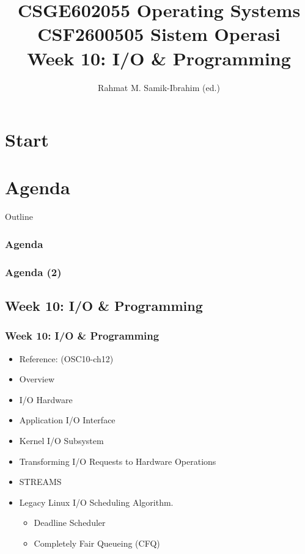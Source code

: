 \documentclass[xcolor=table, notheorems, hyperref={pdfpagelabels=false}]{beamer}
\title[\kopikopi]
{CSGE602055 Operating Systems \\ 
CSF2600505 Sistem Operasi \\
Week 10:
I/O \& Programming}
\author{Rahmat M. Samik-Ibrahim (ed.)}
\date{\revision}
\institute[UI]
{
University of Indonesia \\
\medskip
\url{https://os.vlsm.org/Slides/os10.pdf}
\\ \texttt{Always check for the latest revision!}
}
\begin{document}
\section{Start}
\begin{frame}
\titlepage
\end{frame}





\section{Agenda}
\begin{frame}{Outline}
  \frametitle{Agenda}
  \tableofcontents[sections={1-13}]
\end{frame}
\begin{frame}
   \frametitle{Agenda (2)}
   \tableofcontents[sections={14-}]
\end{frame}




\begin{frame}
\section{Week 10: I/O \& Programming}
\frametitle{Week 10: I/O \& Programming}
\begin{itemize}
\item Reference: (OSC10-ch12)
\item Overview
\item I/O Hardware
\item Application I/O Interface
\item Kernel I/O Subsystem
\item Transforming I/O Requests to Hardware Operations
\item STREAMS
\item Legacy Linux I/O Scheduling Algorithm.
\begin{itemize}
\item Deadline Scheduler
\item Completely Fair Queueing (CFQ)
\end{itemize}
\end{itemize}
\end{frame}
\end{document}

